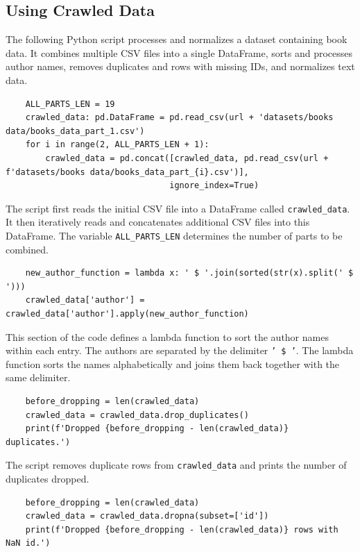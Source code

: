 \documentclass{solutionclass} %
\begin{document}
\subsection*{Using Crawled Data}



\begin{solution}
    The following Python script processes and normalizes a dataset containing book data. It combines multiple CSV files into a single DataFrame, sorts and processes author names, removes duplicates and rows with missing IDs, and normalizes text data.

    \begin{lstlisting}
    ALL_PARTS_LEN = 19
    crawled_data: pd.DataFrame = pd.read_csv(url + 'datasets/books data/books_data_part_1.csv')
    for i in range(2, ALL_PARTS_LEN + 1):
        crawled_data = pd.concat([crawled_data, pd.read_csv(url + f'datasets/books data/books_data_part_{i}.csv')],
                                 ignore_index=True)
    \end{lstlisting}
    
    The script first reads the initial CSV file into a DataFrame called \texttt{crawled\_data}. It then iteratively reads and concatenates additional CSV files into this DataFrame. The variable \texttt{ALL\_PARTS\_LEN} determines the number of parts to be combined.
    
    \begin{lstlisting}
    new_author_function = lambda x: ' $ '.join(sorted(str(x).split(' $ ')))
    crawled_data['author'] = crawled_data['author'].apply(new_author_function)
    \end{lstlisting}
    
    This section of the code defines a lambda function to sort the author names within each entry. The authors are separated by the delimiter \texttt{' \$ '}. The lambda function sorts the names alphabetically and joins them back together with the same delimiter.
    
    \begin{lstlisting}
    before_dropping = len(crawled_data)
    crawled_data = crawled_data.drop_duplicates()
    print(f'Dropped {before_dropping - len(crawled_data)} duplicates.')
    \end{lstlisting}
    
    The script removes duplicate rows from \texttt{crawled\_data} and prints the number of duplicates dropped.
    
    \begin{lstlisting}
    before_dropping = len(crawled_data)
    crawled_data = crawled_data.dropna(subset=['id'])
    print(f'Dropped {before_dropping - len(crawled_data)} rows with NaN id.')
    \end{lstlisting}
    

\end{solution}
\end{document}
